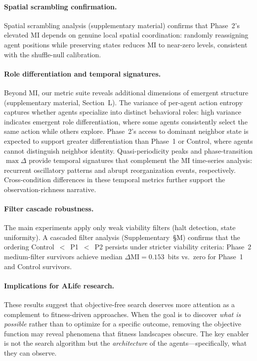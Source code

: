 \documentclass[letterpaper]{article}
\begin{document}
\paragraph{Spatial scrambling confirmation.}
Spatial scrambling analysis (supplementary material) confirms that
Phase~2's elevated MI depends on genuine local spatial coordination:
randomly reassigning agent positions while preserving states reduces MI
to near-zero levels, consistent with the shuffle-null calibration.

\paragraph{Role differentiation and temporal signatures.}
Beyond MI, our metric suite reveals additional dimensions of emergent
structure (supplementary material, Section~L).
The variance of per-agent action entropy captures whether agents
specialize into distinct behavioral roles: high variance indicates
emergent role differentiation, where some agents consistently select the
same action while others explore.  Phase~2's access to dominant neighbor
state is expected to support greater differentiation than Phase~1 or
Control, where agents cannot distinguish neighbor identity.
Quasi-periodicity peaks and phase-transition $\max \Delta$ provide
temporal signatures that complement the MI time-series analysis:
recurrent oscillatory patterns and abrupt reorganization events,
respectively.  Cross-condition differences in these temporal metrics
further support the observation-richness narrative.

\paragraph{Filter cascade robustness.}
The main experiments apply only weak viability filters (halt detection,
state uniformity).  A cascaded filter analysis (Supplementary~\S{}M) confirms that the ordering Control~$<$~P1~$<$~P2 persists under stricter viability criteria: Phase~2 medium-filter survivors achieve median $\Delta\mathrm{MI}=0.153$~bits vs.\ zero for Phase~1 and Control survivors.

\paragraph{Implications for ALife research.}
These results suggest that objective-free search deserves more attention as a
complement to fitness-driven approaches. When the goal is to discover
\emph{what is possible} rather than to optimize for a specific outcome,
removing the objective function may reveal phenomena that fitness landscapes
obscure. The key enabler is not the search algorithm but the
\emph{architecture} of the agents---specifically, what they can observe.
\end{document}
